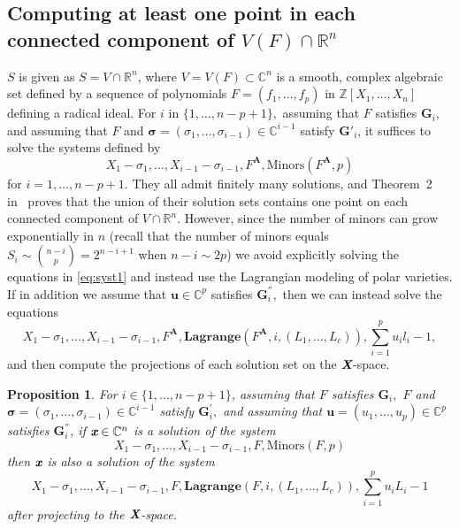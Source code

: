 \documentclass[a4paper]{article}
\def\Xb{\textit{\textbf{X}}}
\def\mA{{\bm A}}
\def\ub{{\bm u}}
\def\xb{\textit{\textbf{x}}}
\def\minors{\textrm{Minors}(F,p)}
\def\minorsA{\textrm{Minors}(F^{\mA},p)}
\newcommand{\ZZ}{{\mathbb{Z}}}
\def\C{\mathbb{C}}
\def\R{\mathbb{R}}
\def\lagF{{\bm{Lagrange}}(F,i,(L_1,\hdots,L_c))}
\def\lagFA{{\bm{Lagrange}}(F^{\mA},i,(L_1,\hdots,L_c))}
\def\udl{\sum_{i=1}^pu_il_i}
\newtheorem{prop}[theorem]{Proposition}
\begin{document}
\subsection{Computing at least one point in each connected component of $V(F) \cap \R^n$} 
%
$S$ is given as $S=V \cap
\R^n$, where $V=V(F) \subset \C^n$ is a smooth, complex algebraic set defined
by a sequence of polynomials $F = (f_1,\hdots,f_p)$ in $\ZZ[X_1,\dots,X_n]$ defining a radical ideal. For $i$ in $\{1,\hdots,n-p+1\},$ assuming that $F$ satisfies $\textbf{G}_i$, and assuming that $F$ and $\bm \sigma = (\sigma_1,\hdots,\sigma_{i-1}) \in \C^{i-1}$ satisfy $\textbf{G}'_i$, it suffices to solve the systems defined by
%
\begin{equation}\label{eq:syst1}
X_1-\sigma_1,\dots,X_{i-1}-\sigma_{i-1}, F^{\mA},  \minorsA  
\end{equation}
%
for $i=1,\dots,n-p+1$.  They all admit finitely many solutions, and
Theorem~2 in~\cite{EMP} proves that the union of their solution sets
contains one point on each connected component of $V \cap \R^n$. However, since the number of minors can grow exponentially in $n$ (recall that the number of minors equals $S_i \sim  \binom{n-i}{p}= 2^{n-i+1}$ when $n-i \sim 2p$)
we avoid explicitly solving the equations in \eqref{eq:syst1} and instead use the Lagrangian modeling of polar varieties. If in addition we assume that $\ub \in \C^p$ satisfies $\textbf{G}_i^{''},$ then we can instead solve the equations
%
\begin{equation}\label{eq:syst2}
X_1-\sigma_1,\dots,X_{i-1}-\sigma_{i-1}, F^{\mA}, \lagFA ,\udl-1,
\end{equation}
%
and then compute the projections of each solution set on the $\Xb$-space. 
%
\begin{prop}\label{prop:correctness}
For $i\in\{1,\hdots,n-p+1\}$, assuming that $F$ satisfies $\bm G_i,$ $F$ and $\bm \sigma = (\sigma_1,\hdots,\sigma_{i-1}) \in \C^{i-1}$ satisfy $\bm G_i^{'},$ and assuming that $\ub = (u_1,\hdots,u_p) \in \C^p$ satisfies $\bm G_i^{''}$, if $\xb \in \C^n$ is a solution of the system 
\begin{equation}\label{sys:minors}
X_1 - \sigma_1,\hdots,X_{i-1} - \sigma_{i-1}, F, \minors  
\end{equation}
then $\xb$ is also a solution of the system 
\begin{equation}\label{sys:lag}
X_1 - \sigma_1,\hdots,X_{i-1} - \sigma_{i-1}, F,\lagF,\sum_{i=1}^p u_i L_i -1
\end{equation}
after projecting to the $\Xb$-space. 
\end{prop}
\end{document}
